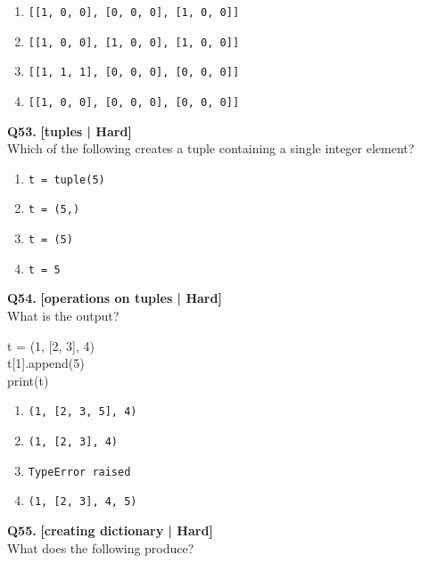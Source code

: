 \begin{enumerate}[label=(\alph*),topsep=2pt,itemsep=1pt,partopsep=0pt,parsep=0pt]
    \item \relax \texttt{[[1, 0, 0], [0, 0, 0], [1, 0, 0]]}
    \item \relax \texttt{[[1, 0, 0], [1, 0, 0], [1, 0, 0]]}
    \item \relax \texttt{[[1, 1, 1], [0, 0, 0], [0, 0, 0]]}
    \item \relax \texttt{[[1, 0, 0], [0, 0, 0], [0, 0, 0]]}
\end{enumerate}
\vspace{2mm}

\noindent\textbf{Q53.} \hfill {\small\color{LPUOrange}\textbf{[tuples | Hard]}}\\[2pt]
Which of the following creates a tuple containing a single integer element?

\begin{enumerate}[label=(\alph*),topsep=2pt,itemsep=1pt,partopsep=0pt,parsep=0pt]
    \item \relax \texttt{t = tuple(5)}
    \item \relax \texttt{t = (5,)}
    \item \relax \texttt{t = (5)}
    \item \relax \texttt{t = 5}
\end{enumerate}
\vspace{2mm}

\noindent\textbf{Q54.} \hfill {\small\color{LPUOrange}\textbf{[operations on tuples | Hard]}}\\[2pt]
What is the output? 

\begin{pycode}
t = (1, [2, 3], 4)\\
t[1].append(5)\\
print(t)
\end{pycode}

\begin{enumerate}[label=(\alph*),topsep=2pt,itemsep=1pt,partopsep=0pt,parsep=0pt]
    \item \relax \texttt{(1, [2, 3, 5], 4)}
    \item \relax \texttt{(1, [2, 3], 4)}
    \item \relax \texttt{TypeError raised}
    \item \relax \texttt{(1, [2, 3], 4, 5)}
\end{enumerate}
\vspace{2mm}

\noindent\textbf{Q55.} \hfill {\small\color{LPUOrange}\textbf{[creating dictionary | Hard]}}\\[2pt]
What does the following produce? 

